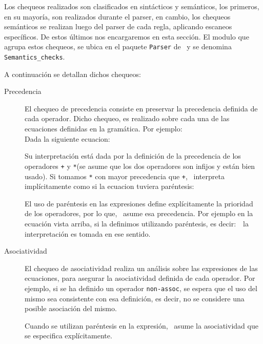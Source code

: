 Los chequeos realizados son clasificados en sintácticos y semánticos, los primeros, en su mayoría, son realizados durante el parser, en cambio, los chequeos semánticos se realizan luego del parser de cada regla, aplicando escaneos específicos. De estos últimos nos encargaremos en esta sección.
El modulo que agrupa estos chequeos, se ubica en el paquete \texttt{Parser} de \maggen\ y se denomina \texttt{Semantics\_checks}.

A continuación se detallan dichos chequeos:

\begin{description}
\item [Precedencia] El chequeo de precedencia consiste en preservar la precedencia definida de cada operador. Dicho chequeo, es realizado sobre cada una de las ecuaciones definidas en la gramática. Por ejemplo:\\ Dada la siguiente ecuacion: 
\begin{center}
\end{center}
Su interpretación está dada por la definición de la precedencia de los operadores \texttt{+} y \texttt{*}(se asume que los dos operadores son infijos y están bien usado). Si tomamos \texttt{*} con mayor precedencia que \texttt{+}, \maggen\ interpreta implícitamente como si la ecuacion tuviera paréntesis:
\begin{center}
\end{center}

El uso de paréntesis en las expresiones define explícitamente la prioridad de los operadores, por lo que, \maggen\ asume esa precedencia. Por ejemplo en la ecuación vista arriba, si la definimos utilizando paréntesis, es decir:\  
 \ la interpretación es tomada en ese sentido.

\item [Asociatividad] El chequeo de asociatividad realiza un análisis sobre las expresiones de las ecuaciones, para asegurar la asociatividad definida de cada operador. Por ejemplo, si se ha definido un operador \texttt{non-assoc}, se espera que el uso del mismo sea consistente con esa definición, es decir, no se considere una posible asociación del mismo. 

Cuando se utilizan paréntesis en la expresión, \maggen\ asume la asociatividad que se especifica explícitamente.


\end{description}
